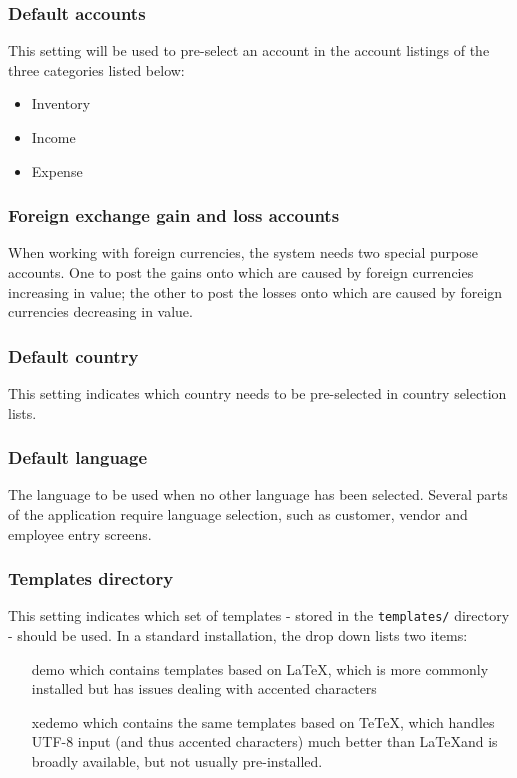 \subsubsection{Default accounts}

 This setting will be used to pre-select an account in
the account listings of the three categories listed below:
\begin{itemize}
\item Inventory
\item Income
\item Expense
\end{itemize}


\subsubsection{Foreign exchange gain and loss accounts}

When working with foreign currencies,
the system needs two special purpose accounts. One to post the gains onto which are
caused by foreign currencies increasing in value; the other to post the losses onto
which are caused by foreign currencies decreasing in value.


\subsubsection{Default country}

This setting indicates which country needs to be pre-selected
   in country selection lists.


\subsubsection{Default language}

The language to be used when no other language has been selected. Several parts of the
application require language selection, such as customer, vendor and employee entry screens.

\subsubsection{Templates directory}

This setting indicates which set of templates - stored in the
   \texttt{templates/} directory - should be used. In a standard installation, the drop down
   lists two items:
   \begin{itemize}
   \item [demo] which contains templates based on \LaTeX, which is more commonly installed but has issues dealing with accented characters
   \item [xedemo] which contains the same templates based on TeTeX, which handles UTF-8 input (and thus accented characters) much better than \LaTeX and is broadly available, but not usually pre-installed.
   \end{itemize}


